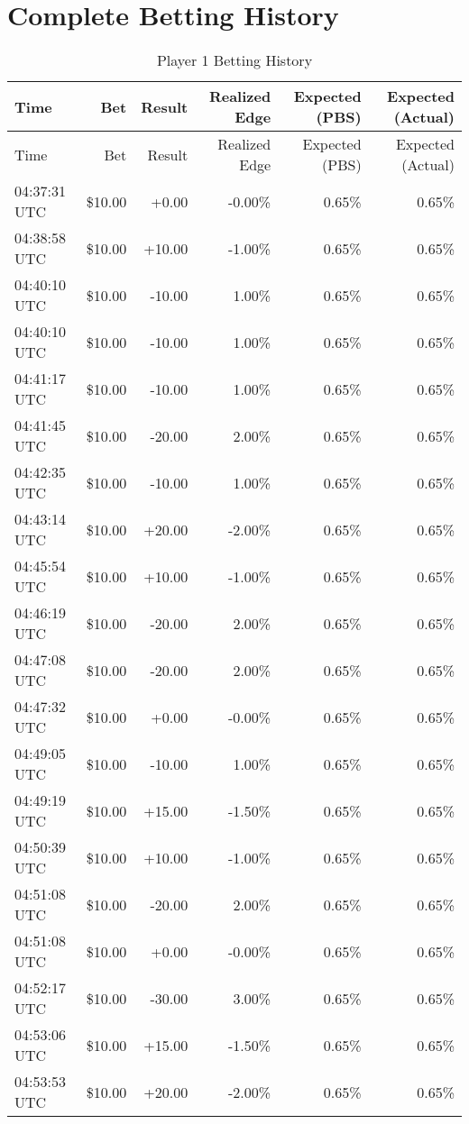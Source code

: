 \documentclass[11pt]{article}
\begin{document}
\section*{Complete Betting History}
\begin{longtable}{l | r | r | r | r | r}
\caption{Player 1 Betting History}\label{tab:history_p1}\\
\hline
Time & Bet & Result & Realized Edge & Expected (PBS) & Expected (Actual) \\ \hline
\endfirsthead
\hline
Time & Bet & Result & Realized Edge & Expected (PBS) & Expected (Actual) \\ \hline
\endhead
04:37:31 UTC & \$10.00 & +0.00 & -0.00\% & 0.65\% & 0.65\% \\
04:38:58 UTC & \$10.00 & +10.00 & -1.00\% & 0.65\% & 0.65\% \\
04:40:10 UTC & \$10.00 & -10.00 & 1.00\% & 0.65\% & 0.65\% \\
04:40:10 UTC & \$10.00 & -10.00 & 1.00\% & 0.65\% & 0.65\% \\
04:41:17 UTC & \$10.00 & -10.00 & 1.00\% & 0.65\% & 0.65\% \\
04:41:45 UTC & \$10.00 & -20.00 & 2.00\% & 0.65\% & 0.65\% \\
04:42:35 UTC & \$10.00 & -10.00 & 1.00\% & 0.65\% & 0.65\% \\
04:43:14 UTC & \$10.00 & +20.00 & -2.00\% & 0.65\% & 0.65\% \\
04:45:54 UTC & \$10.00 & +10.00 & -1.00\% & 0.65\% & 0.65\% \\
04:46:19 UTC & \$10.00 & -20.00 & 2.00\% & 0.65\% & 0.65\% \\
04:47:08 UTC & \$10.00 & -20.00 & 2.00\% & 0.65\% & 0.65\% \\
04:47:32 UTC & \$10.00 & +0.00 & -0.00\% & 0.65\% & 0.65\% \\
04:49:05 UTC & \$10.00 & -10.00 & 1.00\% & 0.65\% & 0.65\% \\
04:49:19 UTC & \$10.00 & +15.00 & -1.50\% & 0.65\% & 0.65\% \\
04:50:39 UTC & \$10.00 & +10.00 & -1.00\% & 0.65\% & 0.65\% \\
04:51:08 UTC & \$10.00 & -20.00 & 2.00\% & 0.65\% & 0.65\% \\
04:51:08 UTC & \$10.00 & +0.00 & -0.00\% & 0.65\% & 0.65\% \\
04:52:17 UTC & \$10.00 & -30.00 & 3.00\% & 0.65\% & 0.65\% \\
04:53:06 UTC & \$10.00 & +15.00 & -1.50\% & 0.65\% & 0.65\% \\
04:53:53 UTC & \$10.00 & +20.00 & -2.00\% & 0.65\% & 0.65\% \\
\hline
\end{longtable}
\end{document}
